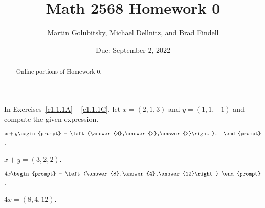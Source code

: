 \documentclass{ximera}
\title{Math 2568 Homework 0}
\date{Due: September 2, 2022}
\author{Martin Golubitsky, Michael Dellnitz, and Brad Findell}
\begin{document}
\begin{abstract}
Online portions of Homework 0.
\end{abstract}
\maketitle


\problemlabel

\noindent In Exercises~\ref{c1.1.1A} -- \ref{c1.1.1C}, let $x=(2,1,3)$ and 
$y=(1,1,-1)$ and compute the given expression.


\begin{exercise}  \label{c1.1.1A}
  $x+y\begin{prompt}
    = \left(\answer{3},\answer{2},\answer{2}\right).
  \end{prompt}$.

\begin{solution}
\ans $ x + y = (3,2,2)$.

\end{solution}
\end{exercise}




\problemlabel

\begin{exercise}  \label{c1.1.1C}
  $4x\begin{prompt}
    = \left(\answer{8},\answer{4},\answer{12}\right)
    \end{prompt}$.

\begin{solution}
\ans $4x = (8,4,12)$.
\end{solution}
\end{exercise}




\problemlabel
\end{document}
